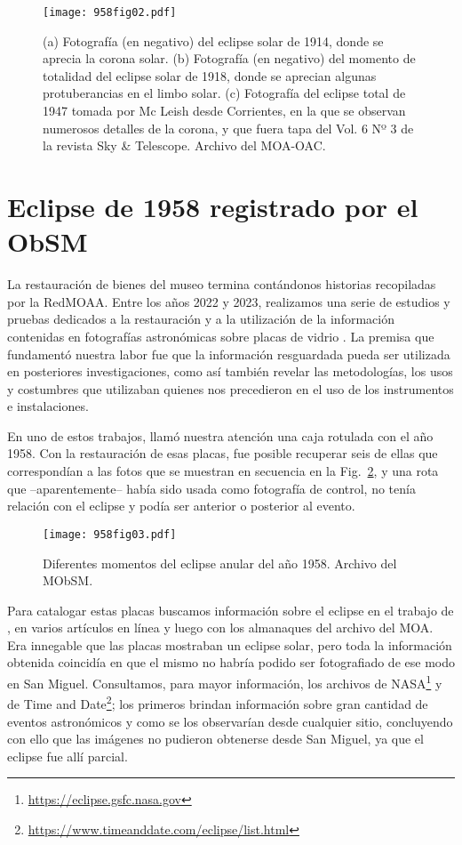 \documentclass[baaa]{baaa}
\begin{document}
\begin{figure}[!t]
\centering
\texttt{[image: 958fig02.pdf]}
\caption{
(a) Fotografía (en negativo) del eclipse solar de 1914, donde se aprecia la corona solar.
(b) Fotografía (en negativo) del momento de totalidad del eclipse solar de 1918, donde se aprecian algunas protuberancias en el limbo solar.
(c) Fotografía del eclipse total de 1947 tomada por Mc Leish desde Corrientes, en la que se observan numerosos detalles de la corona, y que fuera tapa del Vol. 6 Nº 3 de la revista Sky \& Telescope.
Archivo del MOA-OAC.}
\label{fig2}
\end{figure}


\section{Eclipse de 1958 registrado por el ObSM}

La restauración de bienes del museo termina contándonos historias recopiladas por la RedMOAA.
Entre los años 2022 y 2023, realizamos una serie de estudios y pruebas dedicados a la restauración y a la utilización de la
información contenidas en fotografías astronómicas sobre placas de vidrio \citep{2024BAAA...65..317B}.
La premisa que fundamentó nuestra labor fue que la información resguardada pueda ser utilizada en posteriores investigaciones, como así también revelar las metodologías, los usos y costumbres
que utilizaban quienes nos precedieron en el uso de los instrumentos e instalaciones. 

En uno de estos trabajos, llamó nuestra atención una caja rotulada con el año 1958. Con la restauración de esas placas, fue posible recuperar
seis de ellas que correspondían a las fotos que se muestran en secuencia en la  Fig.~\ref{fig3}, y una rota que –aparentemente– había sido usada como fotografía de control, no tenía relación con
el eclipse y podía ser anterior o posterior al evento.

\begin{figure}[!t]
\centering
\texttt{[image: 958fig03.pdf]}
\caption{Diferentes momentos del eclipse anular del año 1958. Archivo del MObSM.}
\label{fig3}
\end{figure}

Para catalogar estas placas buscamos información sobre el eclipse en el trabajo de \cite{spnc_RELEA17}, en varios artículos en línea
y luego con los almanaques del archivo del MOA. Era innegable que las placas mostraban un eclipse solar, pero toda la información obtenida
coincidía en que el mismo no habría podido ser fotografiado de ese modo en San Miguel. Consultamos, para mayor información, los archivos de NASA\footnote{\url{https://eclipse.gsfc.nasa.gov}}
y de Time and Date\footnote{\url{https://www.timeanddate.com/eclipse/list.html}}; los primeros brindan información
sobre gran cantidad de eventos astronómicos y como se los observarían desde cualquier sitio, concluyendo con ello que las imágenes
no pudieron obtenerse desde San Miguel, ya que el eclipse fue allí parcial. 
\end{document}
